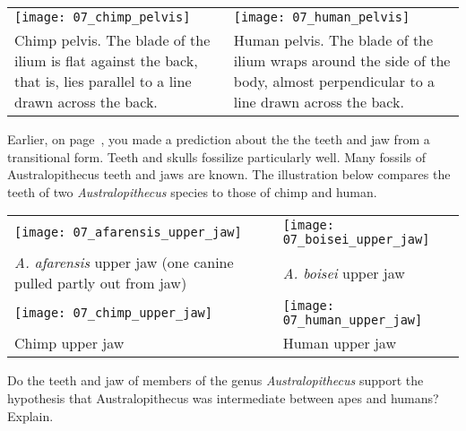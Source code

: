 \documentclass[12pt, hidelinks]{exam}
\begin{document}
\begin{questions}
\begin{longtable}[c]{@{}L{0.35\textwidth}L{0.35\textwidth}@{}}
\texttt{[image: 07\_chimp\_pelvis]} &
\texttt{[image: 07\_human\_pelvis]} \tabularnewline

Chimp pelvis. The blade of the ilium is flat against the back, that is,
lies parallel to a line drawn across the back. &

Human pelvis. The blade of the ilium wraps around the side of the body,
almost perpendicular to a line drawn across the back.\tabularnewline

\end{longtable}

Earlier, on 
page~\pageref{jaw_prediction}, you made a prediction about the 
 the teeth and jaw from a transitional form. Teeth and skulls fossilize particularly well.  Many fossils of Australopithecus teeth and jaws are known.  The illustration below compares the teeth of two \textit{Australopithecus} species to those of chimp and human.

\begin{longtable}[c]{@{}L{0.33\textwidth}L{0.33\textwidth}@{}}

\texttt{[image: 07\_afarensis\_upper\_jaw]} &
\texttt{[image: 07\_boisei\_upper\_jaw]} \tabularnewline
\textit{A. afarensis} upper jaw (one canine pulled partly out from jaw) &
\textit{A. boisei} upper jaw \tabularnewline

\texttt{[image: 07\_chimp\_upper\_jaw]} &
\texttt{[image: 07\_human\_upper\_jaw]} \tabularnewline
Chimp upper jaw &
Human upper jaw \tabularnewline

\end{longtable}

\question[2]
 Do the teeth and jaw of members of the genus \textit{Australopithecus} support the hypothesis that Australopithecus was intermediate between apes and humans?  Explain. 
 
 \end{questions}
 
\end{document}

